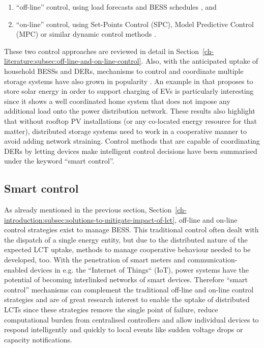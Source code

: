 \begin{enumerate}
	\item ``off-line'' control, using load forecasts and BESS schedules \cite{Cecati2011, Chaouachi2013, Palma-Behnke2013, Khodaei2014}, and
	\item ``on-line'' control, using Set-Points Control (SPC), Model Predictive Control (MPC) or similar dynamic control methods \cite{Salinas2013, Huang2013, Huang2014a, Sun2014a}.
\end{enumerate}

These two control approaches are reviewed in detail in Section~\ref{ch-literature:subsec:off-line-and-on-line-control}.
Also, with the anticipated uptake of household BESSs and DERs, mechanisms to control and coordinate multiple storage systems have also grown in popularity \cite{Mokhtari2013, Sarker2015, Baker2016a, Baumann2017}.
An example in \cite{Baumann2017} that proposes to store solar energy in order to support charging of EVs is particularly interesting since it shows a well coordinated home system that does not impose any additional load onto the power distribution network.
These results also highlight that without rooftop PV installations (or any co-located energy resource for that matter), distributed storage systems need to work in a cooperative manner to avoid adding network straining.
Control methods that are capable of coordinating DERs by letting devices make intelligent control decisions have been summarised under the keyword ``smart control''.

\subsection{Smart control}
\label{ch-introduction:subsec:smart-control}


As already mentioned in the previous section, Section~\ref{ch-introduction:subsec:solutions-to-mitigate-impact-of-lct}, off-line and on-line control strategies exist to manage BESS.
This traditional control often dealt with the dispatch of a single energy entity, but due to the distributed nature of the expected LCT uptake, methods to manage cooperative behaviour needed to be developed, too.
With the penetration of smart meters and communication-enabled devices in e.g. the ``Internet of Things`` (IoT), power systems have the potential of becoming interlinked networks of smart devices.
Therefore ``smart control'' mechanisms can complement the traditional off-line and on-line control strategies and are of great research interest to enable the uptake of distributed LCTs since these strategies remove the single point of failure, reduce computational burden from centralised controllers and allow individual devices to respond intelligently and quickly to local events like sudden voltage drops or capacity notifications.

